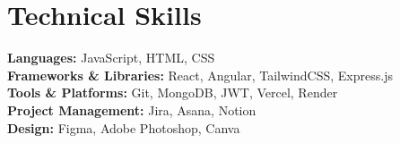 \documentclass[letterpaper,11pt]{article}
\begin{document}
\section{Technical Skills}
\begin{itemize}[leftmargin=0.15in, label={}]
  \small{
    \item{
      \textbf{Languages:} JavaScript, HTML, CSS \\
      \textbf{Frameworks \& Libraries:} React, Angular, TailwindCSS, Express.js \\
      \textbf{Tools \& Platforms:} Git, MongoDB, JWT, Vercel, Render \\
      \textbf{Project Management:} Jira, Asana, Notion \\
      \textbf{Design:} Figma, Adobe Photoshop, Canva
    }
  }
\end{itemize}


\end{document}
